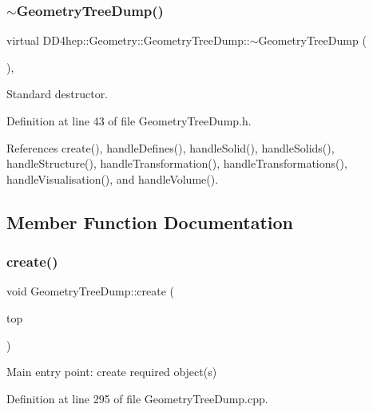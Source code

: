 \subsubsection{\texorpdfstring{$\sim$\+Geometry\+Tree\+Dump()}{~GeometryTreeDump()}}
{\footnotesize\ttfamily virtual D\+D4hep\+::\+Geometry\+::\+Geometry\+Tree\+Dump\+::$\sim$\+Geometry\+Tree\+Dump (\begin{DoxyParamCaption}{ }\end{DoxyParamCaption})\hspace{0.3cm}{\ttfamily [inline]}, {\ttfamily [virtual]}}



Standard destructor. 



Definition at line 43 of file Geometry\+Tree\+Dump.\+h.



References create(), handle\+Defines(), handle\+Solid(), handle\+Solids(), handle\+Structure(), handle\+Transformation(), handle\+Transformations(), handle\+Visualisation(), and handle\+Volume().



\subsection{Member Function Documentation}
\hypertarget{class_d_d4hep_1_1_geometry_1_1_geometry_tree_dump_a597ecc457c64cbfdf0fe06301d2d458d}{}\label{class_d_d4hep_1_1_geometry_1_1_geometry_tree_dump_a597ecc457c64cbfdf0fe06301d2d458d} 
\subsubsection{\texorpdfstring{create()}{create()}}
{\footnotesize\ttfamily void Geometry\+Tree\+Dump\+::create (\begin{DoxyParamCaption}\item[{\hyperlink{class_d_d4hep_1_1_geometry_1_1_det_element}{Det\+Element}}]{top }\end{DoxyParamCaption})}



Main entry point\+: create required object(s) 



Definition at line 295 of file Geometry\+Tree\+Dump.\+cpp.



